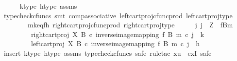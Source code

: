 \begin{isabellebody}
\ \ \ \ \isamarkupfalse%
\ k{\isacharunderscore}{\kern0pt}type\ h{\isacharunderscore}{\kern0pt}type\ assms\isanewline
\ \ \ \ \isamarkupfalse%
\ {\isacharparenleft}{\kern0pt}typecheck{\isacharunderscore}{\kern0pt}cfuncs{\isacharcomma}{\kern0pt}\ smt\ comp{\isacharunderscore}{\kern0pt}associative{}\ left{\isacharunderscore}{\kern0pt}cart{\isacharunderscore}{\kern0pt}proj{\isacharunderscore}{\kern0pt}cfunc{\isacharunderscore}{\kern0pt}prod\ left{\isacharunderscore}{\kern0pt}cart{\isacharunderscore}{\kern0pt}proj{\isacharunderscore}{\kern0pt}type\isanewline
\ \ \ \ \ \ \ \ mk{\isacharunderscore}{\kern0pt}eq{\isacharunderscore}{\kern0pt}fh\ right{\isacharunderscore}{\kern0pt}cart{\isacharunderscore}{\kern0pt}proj{\isacharunderscore}{\kern0pt}cfunc{\isacharunderscore}{\kern0pt}prod\ right{\isacharunderscore}{\kern0pt}cart{\isacharunderscore}{\kern0pt}proj{\isacharunderscore}{\kern0pt}type{\isacharparenright}{\kern0pt}\isanewline
\ \ \isamarkupfalse%
\ \isamarkupfalse%
\ {\isachardoublequoteopen}{\isasymexists}j{\isachardot}{\kern0pt}\ j\ {\isacharcolon}{\kern0pt}\ Z\ {\isasymrightarrow}\ {\isacharparenleft}{\kern0pt}f\isactrlsup {\isacharminus}{\kern0pt}B{\isasymrparr}\isactrlbsub m\isactrlesub {\isacharparenright}{\kern0pt}\ {\isasymand}\isanewline
\ \ \ \ \ \ \ \ \ {\isacharparenleft}{\kern0pt}right{\isacharunderscore}{\kern0pt}cart{\isacharunderscore}{\kern0pt}proj\ X\ B\ {\isasymcirc}\isactrlsub c\ inverse{\isacharunderscore}{\kern0pt}image{\isacharunderscore}{\kern0pt}mapping\ f\ B\ m{\isacharparenright}{\kern0pt}\ {\isasymcirc}\isactrlsub c\ j\ {\isacharequal}{\kern0pt}\ k\ {\isasymand}\isanewline
\ \ \ \ \ \ \ \ \ {\isacharparenleft}{\kern0pt}left{\isacharunderscore}{\kern0pt}cart{\isacharunderscore}{\kern0pt}proj\ X\ B\ {\isasymcirc}\isactrlsub c\ inverse{\isacharunderscore}{\kern0pt}image{\isacharunderscore}{\kern0pt}mapping\ f\ B\ m{\isacharparenright}{\kern0pt}\ {\isasymcirc}\isactrlsub c\ j\ {\isacharequal}{\kern0pt}\ h{\isachardoublequoteclose}\isanewline
\ \ \isamarkupfalse%
\ {\isacharparenleft}{\kern0pt}insert\ k{\isacharunderscore}{\kern0pt}type\ h{\isacharunderscore}{\kern0pt}type\ assms{\isacharcomma}{\kern0pt}\ typecheck{\isacharunderscore}{\kern0pt}cfuncs{\isacharcomma}{\kern0pt}\ safe{\isacharcomma}{\kern0pt}\ rule{\isacharunderscore}{\kern0pt}tac\ x{\isacharequal}{\kern0pt}u\ \ exI{\isacharcomma}{\kern0pt}\ safe{\isacharparenright}{\kern0pt}\isanewline
\ \ \ \ \isamarkupfalse%

\end{isabellebody}

